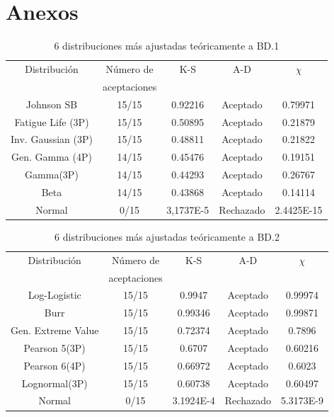 \documentclass[12pt]{report}
\begin{document}
\appendix
\chapter{Anexos}
\begin{table}[h!]
	\centering
	\begin{tabular}{|c|c|c|c|c|}			
											\hline
		Distribución	  &Número de	&K-S	&A-D	& $\chi$  \\
						  &	aceptaciones &     &	 &     \\ \hline
		   Johnson SB     &    15/15    & 0.92216   & 	Aceptado     &0.79971    \\ \hline
		Fatigue Life (3P) &    15/15	& 0.50895    &  Aceptado   	& 0.21879   \\ \hline
		Inv. Gaussian (3P)&    15/15	& 0.48811  	&  Aceptado 	&   0.21822 	\\ \hline 
		Gen. Gamma (4P)   &    14/15	& 0.45476   &   Aceptado	& 0.19151   	\\ \hline
		Gamma(3P)         &   14/15	&     0.44293   &      	Aceptado   &  0.26767  	\\ \hline
		Beta              &   14/15	& 0.43868     &   	Aceptado	& 0.14114    	\\ \hline
				Normal   &   0/15	& 3,1737E-5   &   	Rechazado	& 2.4425E-15	\\ \hline  %
	\end{tabular}
	\caption{6 distribuciones más ajustadas teóricamente a BD.1}
	\label{teo_BD1}
\end{table}


\begin{table}[h!]
	\centering
	\begin{tabular}{|c|c|c|c|c|}			
		\hline
		Distribución	  &Número de	&K-S	&A-D	& $\chi$  \\
							&	aceptaciones &     &	 &     \\ \hline
		Log-Logistic    &    15/15    & 0.9947   & 	Aceptado     &0.99974    \\ \hline
		Burr &    15/15	& 0.99346    &  Aceptado   	& 0.99871   \\ \hline
		Gen. Extreme Value &    15/15	& 0.72374  	&  Aceptado 	&   0.7896 	\\ \hline 
		Pearson 5(3P)  &    15/15	& 0.6707   &   Aceptado	& 0.60216   	\\ \hline
		Pearson 6(4P)  &   15/15	&     0.66972   &      	Aceptado   &  0.6023  	\\ \hline
		Lognormal(3P)   &   15/15	& 0.60738    &   	Aceptado	& 0.60497    	\\ \hline
		Normal   &   0/15	& 3.1924E-4   &   	Rechazado	& 5.3173E-9	\\ \hline  %
	\end{tabular}
	\caption{6 distribuciones más ajustadas teóricamente a BD.2}
	\label{teo_BD2}
\end{table}
\end{document}
